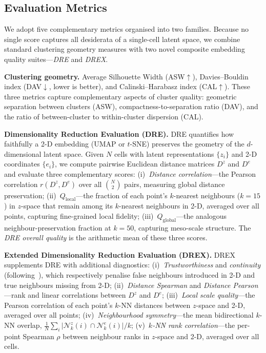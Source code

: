 \documentclass[journal]{IEEEtran}
\begin{document}
\subsection{Evaluation Metrics}
\label{sec:experiments:metrics}

We adopt five complementary metrics organised into two families. Because no single score captures all desiderata of a single-cell latent space, we combine standard clustering geometry measures with two novel composite embedding quality suites---\emph{DRE} and \emph{DREX}.

\textbf{Clustering geometry.} Average Silhouette Width (ASW$\uparrow$), Davies--Bouldin index (DAV$\downarrow$, lower is better), and Calinski--Harabasz index (CAL$\uparrow$). These three metrics capture complementary aspects of cluster quality: geometric separation between clusters (ASW), compactness-to-separation ratio (DAV), and the ratio of between-cluster to within-cluster dispersion (CAL).

\textbf{Dimensionality Reduction Evaluation (DRE).}
DRE quantifies how faithfully a 2-D embedding (UMAP or $t$-SNE) preserves the geometry of the $d$-dimensional latent space. Given $N$ cells with latent representations $\{z_i\}$ and 2-D coordinates $\{e_i\}$, we compute pairwise Euclidean distance matrices $D^{z}$ and $D^{e}$ and evaluate three complementary scores:
(i)~\emph{Distance correlation}---the Pearson correlation $r(D^{z}, D^{e})$ over all $\binom{N}{2}$ pairs, measuring global distance preservation;
(ii)~$Q_{\mathrm{local}}$---the fraction of each point's $k$-nearest neighbours ($k{=}15$) in $z$-space that remain among its $k$-nearest neighbours in 2-D, averaged over all points, capturing fine-grained local fidelity;
(iii)~$Q_{\mathrm{global}}$---the analogous neighbour-preservation fraction at $k{=}50$, capturing meso-scale structure.
The \emph{DRE overall quality} is the arithmetic mean of these three scores.

\textbf{Extended Dimensionality Reduction Evaluation (DREX).}
DREX supplements DRE with additional diagnostics:
(i)~\emph{Trustworthiness} and \emph{continuity} (following~\cite{venna2006local}), which respectively penalise false neighbours introduced in 2-D and true neighbours missing from 2-D;
(ii)~\emph{Distance Spearman} and \emph{Distance Pearson}---rank and linear correlations between $D^{z}$ and $D^{e}$;
(iii)~\emph{Local scale quality}---the Pearson correlation of each point's $k$-NN distances between $z$-space and 2-D, averaged over all points;
(iv)~\emph{Neighbourhood symmetry}---the mean bidirectional $k$-NN overlap, $\frac{1}{N}\sum_{i}\lvert\mathcal{N}^{z}_{k}(i)\cap\mathcal{N}^{e}_{k}(i)\rvert / k$;
(v)~\emph{$k$-NN rank correlation}---the per-point Spearman $\rho$ between neighbour ranks in $z$-space and 2-D, averaged over all cells.
\end{document}
